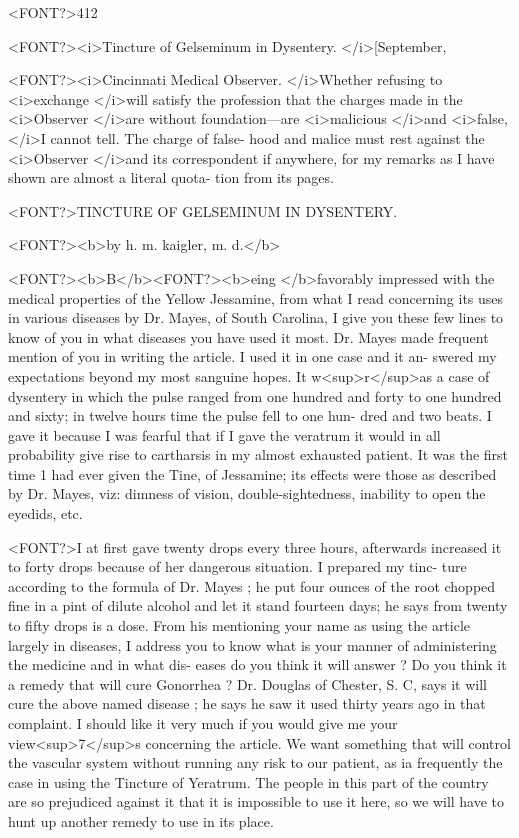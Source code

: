 <FONT?>412

<FONT?><i>Tincture of Gelseminum in Dysentery. </i>[September,

<FONT?><i>Cincinnati Medical Observer. </i>Whether refusing to <i>exchange </i>will
satisfy the profession that the charges made in the <i>Observer </i>are without
foundation---are <i>malicious </i>and <i>false, </i>I cannot tell. The charge of false-
hood and malice must rest against the <i>Observer </i>and its correspondent
if anywhere, for my remarks as I have shown are almost a literal quota-
tion from its pages.

<FONT?>TINCTURE OF GELSEMINUM IN DYSENTERY.

<FONT?><b>by h. m. kaigler, m. d.</b>

<FONT?><b>B</b><FONT?><b>eing </b>favorably impressed with the medical properties of the Yellow
Jessamine, from what I read concerning its uses in various diseases by
Dr. Mayes, of South Carolina, I give you these few lines to know of
you in what diseases you have used it most. Dr. Mayes made frequent
mention of you in writing the article. I used it in one case and it an-
swered my expectations beyond my most sanguine hopes. It w<sup>r</sup>as a case
of dysentery in which the pulse ranged from one hundred and forty to
one hundred and sixty; in twelve hours time the pulse fell to one hun-
dred and two beats. I gave it because I was fearful that if I gave the
veratrum it would in all probability give rise to cartharsis in my almost
exhausted patient. It was the first time 1 had ever given the Tine, of
Jessamine; its effects were those as described by Dr. Mayes, viz: dimness
of vision, double-sightedness, inability to open the eyedids, etc.

<FONT?>I at first gave twenty drops every three hours, afterwards increased it
to forty drops because of her dangerous situation. I prepared my tinc-
ture according to the formula of Dr. Mayes ; he put four ounces of the
root chopped fine in a pint of dilute alcohol and let it stand fourteen days;
he says from twenty to fifty drops is a dose. From his mentioning your
name as using the article largely in diseases, I address you to know
what is your manner of administering the medicine and in what dis-
eases do you think it will answer ? Do you think it a remedy that will
cure Gonorrhea ? Dr. Douglas of Chester, S. C, says it will cure the above
named disease ; he says he saw it used thirty years ago in that complaint.
I should like it very much if you would give me your view<sup>7</sup>s concerning
the article. We want something that will control the vascular system
without running any risk to our patient, as ia frequently the case in
using the Tincture of Yeratrum. The people in this part of the country
are so prejudiced against it that it is impossible to use it here, so we will
have to hunt up another remedy to use in its place.\endinput
